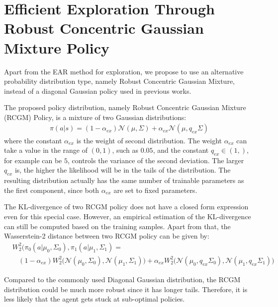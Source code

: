 \section{Efficient Exploration Through Robust Concentric Gaussian Mixture Policy}
Apart from the EAR method for exploration, we propose to use an alternative probability distribution type, namely Robust Concentric Gaussian Mixture, instead of a diagonal Gaussian policy used in previous works.

The proposed policy distribution, namely Robust Concentric Gaussian Mixture (RCGM) Policy, is a mixture of two Gaussian distributions:
\begin{align}
\pi (a|s) = (1-\alpha_{ex})\mathcal{N}(\mu,\Sigma) + \alpha_{ex} \mathcal{N}(\mu,q_{ex}\Sigma)
\end{align}
where the constant $\alpha_{ex}$ is the weight of second distribution. The weight $\alpha_{ex}$ can take a value in the range of $(0,1)$, such as $0.05$, and the constant $q_{ex} \in (1,)$, for example can be $5$, controls the variance of the second deviation. The larger $q_{ex}$ is, the higher the likelihood will be in the tails of the distribution. The resulting distribution actually has the same number of trainable parameters as the first component, since both $\alpha_{ex}$ are set to fixed parameters.

The KL-divergence of two RCGM policy does not have a closed form expression even for this special case. However, an empirical estimation of the KL-divergence can still be computed based on the training samples. Apart from that, the Wasserstein-2 distance between two RCGM policy can be given by:
\begin{align}&W_2^2(\pi_{0}(a|\mu_0,\Sigma_0), \pi_{1}(a|\mu_1,\Sigma_1) =  \\ \nonumber
& \ \ \ \ (1-\alpha_{ex})
W_2^2\big(\mathcal{N}(\mu_0,\Sigma_0), \mathcal{N}(\mu_1,\Sigma_1)\big)
+ \alpha_{ex} W_2^2\big(\mathcal{N}(\mu_0,q_{ex}\Sigma_0), \mathcal{N}(\mu_1,q_{ex}\Sigma_1)\big)
\end{align}


Compared to the commonly used Diagonal Gaussian distribution, the RCGM distribution could be much more robust since it has longer tails. Therefore, it is less likely that the agent gets stuck at sub-optimal policies.

